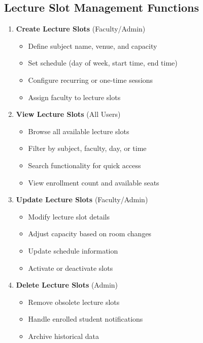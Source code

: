 \subsection{Lecture Slot Management Functions}

\begin{enumerate}[leftmargin=*]
    \item \textbf{Create Lecture Slots} (Faculty/Admin)
    \begin{itemize}
        \item Define subject name, venue, and capacity
        \item Set schedule (day of week, start time, end time)
        \item Configure recurring or one-time sessions
        \item Assign faculty to lecture slots
    \end{itemize}
    
    \item \textbf{View Lecture Slots} (All Users)
    \begin{itemize}
        \item Browse all available lecture slots
        \item Filter by subject, faculty, day, or time
        \item Search functionality for quick access
        \item View enrollment count and available seats
    \end{itemize}
    
    \item \textbf{Update Lecture Slots} (Faculty/Admin)
    \begin{itemize}
        \item Modify lecture slot details
        \item Adjust capacity based on room changes
        \item Update schedule information
        \item Activate or deactivate slots
    \end{itemize}
    
    \item \textbf{Delete Lecture Slots} (Admin)
    \begin{itemize}
        \item Remove obsolete lecture slots
        \item Handle enrolled student notifications
        \item Archive historical data
    \end{itemize}
\end{enumerate}

